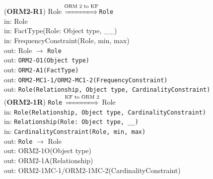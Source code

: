 \documentclass[sn-mathphys]{sn-jnl}
\begin{document}
{{{%

({\bf ORM2-R1}) Role $\overset{\text{ORM 2 to KF}}{\xLongrightarrow{\hspace*{1.4cm}}}${\tt Role}\\
\hspace*{0.3cm}in: Role\\
\hspace*{0.3cm}in: FactType(Role: Object type, \_\_)\\
\hspace*{0.3cm}in: FrequencyConstraint(Role, min, max)\\
\hspace*{0.5cm}out: Role $\rightarrow$ {\tt Role}\\
\hspace*{0.5cm}out: {\tt ORM2-O1(Object type)}\\
\hspace*{0.5cm}out: {\tt ORM2-A1(FactType)}\\
\hspace*{0.5cm}out: {\tt ORM2-MC1-1/ORM2-MC1-2(FrequencyConstraint)}\\
\hspace*{0.5cm}out: {\tt Role(Relationship, Object type, CardinalityConstraint)}\\

({\bf ORM2-1R}) {\tt Role} $\overset{\text{KF to ORM 2}}{\xLongrightarrow{\hspace*{1.4cm}}}${ Role\\
\hspace*{0.3cm}in: {\tt Role(Relationship, Object type, CardinalityConstraint)}\\
\hspace*{0.3cm}in: {\tt Relationship(Role: Object type, \_\_)}\\
\hspace*{0.3cm}in: {\tt CardinalityConstraint(Role, min, max)}\\
\hspace*{0.5cm}out: {\tt Role} $\rightarrow$ {Role}\\
\hspace*{0.5cm}out: {ORM2-1O(Object type)}\\
\hspace*{0.5cm}out: {ORM2-1A(Relationship)}\\
\hspace*{0.5cm}out: {ORM2-1MC-1/ORM2-1MC-2(CardinalityConstraint)}\\

}}}}
\end{document}
